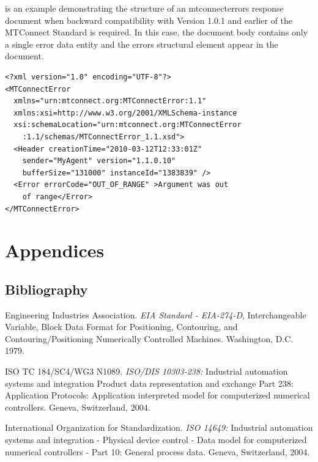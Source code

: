 \documentclass{mtconnect}	%
\begin{document}
 is an example demonstrating the structure of an \gls{mtconnecterrors response document} when backward compatibility with Version 1.0.1 and earlier of the MTConnect Standard is required.  In this case, the \gls{document body} contains only a single \gls{error} \gls{data entity} and the \gls{errors} \gls{structural element} \MUSTNOT appear in the document. 

\begin{lstlisting}[firstnumber=1,escapechar=|,% 
caption={Example of structure for MTConnectError when backward compatibility is required}, label={lst:structure-for-mtconnecterror-when-backward-compatibility-is-required}]
<?xml version="1.0" encoding="UTF-8"?>
<MTConnectError
  xmlns="urn:mtconnect.org:MTConnectError:1.1"
  xmlns:xsi=http://www.w3.org/2001/XMLSchema-instance
  xsi:schemaLocation="urn:mtconnect.org:MTConnectError
    :1.1/schemas/MTConnectError_1.1.xsd">
  <Header creationTime="2010-03-12T12:33:01Z"
    sender="MyAgent" version="1.1.0.10" 
    bufferSize="131000" instanceId="1383839" />
  <Error errorCode="OUT_OF_RANGE" >Argument was out 
    of range</Error>
</MTConnectError>
\end{lstlisting}




\appendix
\section*{Appendices}
\renewcommand{\thesubsection}{\Alph{subsection}}

\subsection{Bibliography}
\label{Bibliography}

Engineering Industries Association. \textit{EIA Standard - EIA-274-D}, Interchangeable Variable, Block Data Format for Positioning, Contouring, and Contouring/Positioning Numerically Controlled Machines. Washington, D.C. 1979.

ISO TC 184/SC4/WG3 N1089. \textit{ISO/DIS 10303-238:} Industrial automation systems and integration  Product data representation and exchange  Part 238: Application Protocols: Application interpreted model for computerized numerical controllers. Geneva, Switzerland, 2004.

International Organization for Standardization. \textit{ISO 14649:} Industrial automation systems and integration - Physical device control - Data model for computerized numerical controllers - Part 10: General process data. Geneva, Switzerland, 2004.
\end{document}
